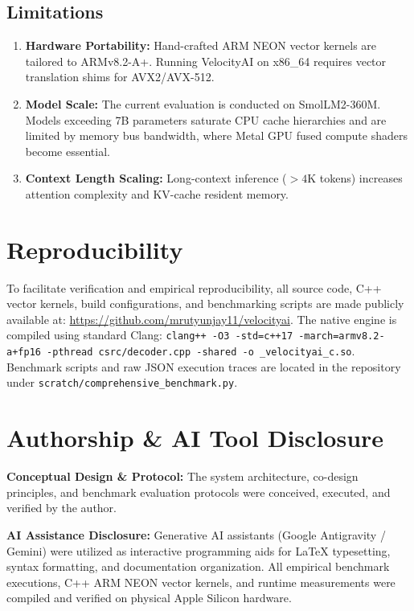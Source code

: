 \documentclass[10pt,twocolumn]{article}
\begin{document}
\subsection{Limitations}
\begin{enumerate}
    \item \textbf{Hardware Portability:} Hand-crafted ARM NEON vector kernels are tailored to ARMv8.2-A+. Running VelocityAI on x86\_64 requires vector translation shims for AVX2/AVX-512.
    \item \textbf{Model Scale:} The current evaluation is conducted on SmolLM2-360M. Models exceeding 7B parameters saturate CPU cache hierarchies and are limited by memory bus bandwidth, where Metal GPU fused compute shaders become essential.
    \item \textbf{Context Length Scaling:} Long-context inference ($> 4\text{K}$ tokens) increases attention complexity and KV-cache resident memory.
\end{enumerate}

\section{Reproducibility}
To facilitate verification and empirical reproducibility, all source code, C++ vector kernels, build configurations, and benchmarking scripts are made publicly available at: \url{https://github.com/mrutyunjay11/velocityai}. The native engine is compiled using standard Clang:
\texttt{clang++ -O3 -std=c++17 -march=armv8.2-a+fp16 -pthread csrc/decoder.cpp -shared -o \_velocityai\_c.so}. Benchmark scripts and raw JSON execution traces are located in the repository under \texttt{scratch/comprehensive\_benchmark.py}.

\section{Authorship \& AI Tool Disclosure}
\noindent\textbf{Conceptual Design \& Protocol:} The system architecture, co-design principles, and benchmark evaluation protocols were conceived, executed, and verified by the author.

\noindent\textbf{AI Assistance Disclosure:} Generative AI assistants (Google Antigravity / Gemini) were utilized as interactive programming aids for LaTeX typesetting, syntax formatting, and documentation organization. All empirical benchmark executions, C++ ARM NEON vector kernels, and runtime measurements were compiled and verified on physical Apple Silicon hardware.
\end{document}
